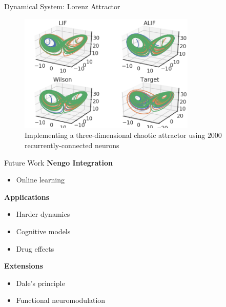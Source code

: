 \documentclass[aspectratio=169]{beamer}
\begin{document}
\begin{frame}{Dynamical System: Lorenz Attractor}
\begin{figure}
    \centering
    \includegraphics[width=0.75\textwidth]{media/lorenz.png}
    \caption{Implementing a three-dimensional chaotic attractor using $2000$ recurrently-connected neurons}
\end{figure}
\end{frame}


\begin{frame}{Future Work}
\textbf{Nengo Integration}
\begin{itemize}
    \item Online learning
\end{itemize}
\vspace{0.5cm}
\textbf{Applications}
\begin{itemize}
    \item Harder dynamics
    \item Cognitive models
    \item Drug effects
\end{itemize}
\vspace{0.5cm}
\textbf{Extensions}
\begin{itemize}
    \item Dale's principle
    \item Functional neuromodulation
\end{itemize}
\end{frame}
\end{document}
